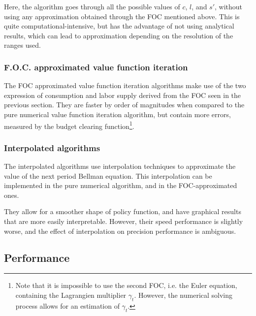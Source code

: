 \documentclass{article}
\begin{document}
Here, the algorithm goes through all the possible values of
$c$, $l$, and $s'$, without using any approximation obtained 
through the FOC mentioned above. 
This is quite computational-intensive, but 
has the advantage of not using analytical results, 
which can lead to approximation depending on the resolution of the 
ranges used.

\subsubsection{F.O.C. approximated value function iteration}

The FOC approximated value function iteration algorithms
make use of the two expression of consumption and labor supply 
derived from the FOC
seen in the previous section. 
They are faster by order of magnitudes when compared to the pure numerical 
value function iteration algorithm,
but contain more errors, measured by the budget clearing function\footnote{Note that it is impossible to use the second FOC, i.e. the 
Euler equation, containing the 
Lagrangien multiplier $\gamma_{t}$. 
However, the numerical solving process 
allows for an estimation of $\gamma_{t}$.}.

\subsubsection{Interpolated algorithms}

The interpolated algorithms 
use interpolation techniques to approximate 
the value of the next period Bellman equation. 
This interpolation can be implemented in the pure numerical 
algorithm, and in the FOC-approximated ones. 

They allow for a smoother shape of policy function, 
and have graphical results that are more easily interpretable.
However, their speed
performance is slightly worse, 
and the effect of interpolation on precision
performance is ambiguous. 

\subsection{Performance}
\end{document}
